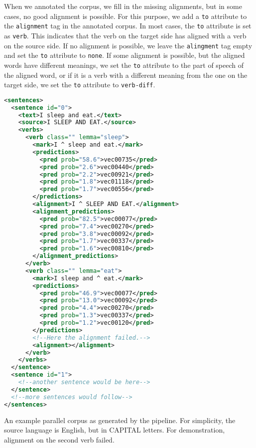 When we annotated the corpus, we fill in the missing alignments, but in some cases, no good alignment is possible. For this purpose, we add a \texttt{to} attribute to the \texttt{alignment} tag in the annotated corpus. In most cases, the \texttt{to} attribute is set as \texttt{verb}. This indicates that the verb on the target side has aligned with a verb on the source side. If no alignment is possible, we leave the \texttt{alingment} tag empty and set the \texttt{to} attribute to \texttt{none}. If some alignment is possible, but the aligned words have different meanings, we set the \texttt{to} attribute to the part of speech of the aligned word, or if it is a verb with a different meaning from the one on the target side, we set the \texttt{to} attribute to \texttt{verb-diff}. 

\begin{listing}
\begin{lstlisting}[language=xml]
<sentences>
  <sentence id="0">
    <text>I sleep and eat.</text>
    <source>I SLEEP AND EAT.</source>
    <verbs>
      <verb class="" lemma="sleep">
        <mark>I ^ sleep and eat.</mark>
        <predictions>
          <pred prob="58.6">vec00735</pred>
          <pred prob="2.6">vec00440</pred>
          <pred prob="2.2">vec00921</pred>
          <pred prob="1.8">vec01118</pred>
          <pred prob="1.7">vec00556</pred>
        </predictions>
        <alignment>I ^ SLEEP AND EAT.</alignment>
        <alignment_predictions>
          <pred prob="82.5">vec00077</pred>
          <pred prob="7.4">vec00270</pred>
          <pred prob="3.8">vec00092</pred>
          <pred prob="1.7">vec00337</pred>
          <pred prob="1.6">vec00810</pred>
        </alignment_predictions>
      </verb>
      <verb class="" lemma="eat">
        <mark>I sleep and ^ eat.</mark>
        <predictions>
          <pred prob="46.9">vec00077</pred>
          <pred prob="13.0">vec00092</pred>
          <pred prob="4.4">vec00270</pred>
          <pred prob="1.3">vec00337</pred>
          <pred prob="1.2">vec00120</pred>
        </predictions>
        <!--Here the alignment failed.-->
        <alignment></alignment>
      </verb>
    </verbs>
  </sentence>
  <sentence id="1">
    <!--another sentence would be here-->
  </sentence>
  <!--more sentences would follow-->
</sentences>
\end{lstlisting}
\caption{
An example parallel corpus as generated by the pipeline. For simplicity, the source language is English, but in CAPITAL letters. For demonstration, alignment on the second verb failed.
}
\label{lst:generated_corpus}
\end{listing}

